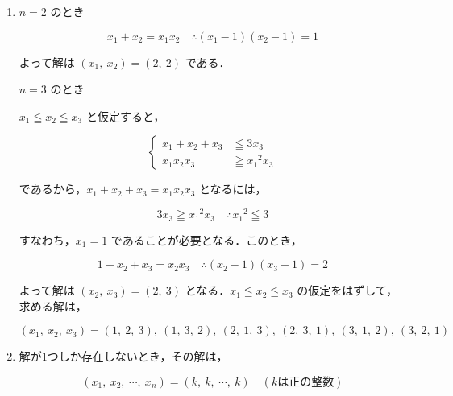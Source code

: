 \documentclass[a4paper]{ltjsarticle}
\begin{document}
\begin{enumerate}[label=(\arabic*)]
    \item $n=2$ のとき

          \begin{equation*}
              x_1+x_2=x_{1}x_{2} \quad \therefore (x_1-1)(x_2-1)=1
          \end{equation*}

          よって解は $(x_1,\ x_2)=(2,\ 2)$ である．

          $n=3$ のとき

          $x_1\leqq x_2\leqq x_3$ と仮定すると，

          \begin{equation*}
              \left\{\begin{aligned}
                  x_1+x_2+x_3     & \leqq 3x_3           \\
                  x_{1}x_{2}x_{3} & \geqq {x_{1}}^{2}x_3
              \end{aligned}\right.
          \end{equation*}

          であるから，$x_1+x_2+x_3=x_{1}x_{2}x_{3}$ となるには，

          \begin{equation*}
              3x_3\geqq {x_{1}}^{2}x_3 \quad \therefore{x_{1}}^{2}\leqq 3
          \end{equation*}

          すなわち，$x_1=1$ であることが必要となる．このとき，

          \begin{equation*}
              1+x_2+x_3=x_2x_3 \quad \therefore (x_2-1)(x_3-1)=2
          \end{equation*}

          よって解は $(x_2,\ x_3)=(2,\ 3)$ となる．$x_1\leqq x_2\leqq x_3$ の仮定をはずして，求める解は，

          \begin{equation*}
              (x_1,\ x_2,\ x_3)=(1,\ 2,\ 3),\ (1,\ 3,\ 2),\ (2,\ 1,\ 3),\ (2,\ 3,\ 1),\ (3,\ 1,\ 2),\ (3,\ 2,\ 1)
          \end{equation*}

    \item 解が1つしか存在しないとき，その解は，

          \begin{equation*}
              (x_1,\ x_2,\ \cdots,\ x_n)=(k,\ k,\ \cdots,\ k)\quad (k\text{は正の整数})
          \end{equation*}


\end{enumerate}
\end{document}
